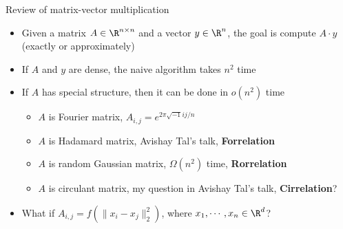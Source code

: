 \begin{frame}{Review of matrix-vector multiplication}

\begin{itemize}
  \item <+-> Given a matrix $A \in \R^{n \times n}$ and a vector $y \in \R^n$, the goal is compute $A \cdot y$ (exactly or approximately)
  \item <+-> If $A$ and $y$ are dense, the naive algorithm takes $n^2$ time
  \item <+-> If $A$ has special structure, then it can be done in $o(n^2)$ time
  \begin{itemize}
    \item <+-> $A$ is Fourier matrix, $A_{i,j} = e^{2\pi \sqrt{-1} ij/n}$
    \item <+-> $A$ is Hadamard matrix, Avishay Tal's talk, {\bf Forrelation}
    \item <+-> $A$ is random Gaussian matrix, $\Omega(n^2)$ time, {\bf Rorrelation}
    \item <+-> $A$ is circulant matrix, my question in Avishay Tal's talk, {\bf Cirrelation}? \vspace{-4mm}
  \end{itemize} 
  \item <+-> What if $A_{i,j} = f(\| x_i - x_j \|_2^2)$, where $x_1, \cdots, x_n \in \R^d$?
\end{itemize}
\end{frame}

